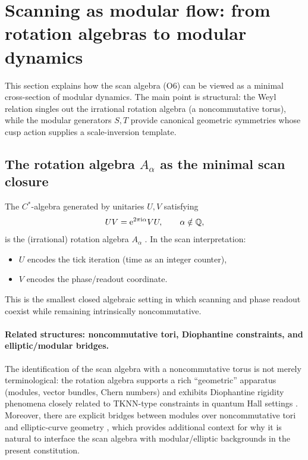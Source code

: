 \section{Scanning as modular flow: from rotation algebras to modular dynamics}
\label{sec:scanning_as_modular_flow}

This section explains how the scan algebra (O6) can be viewed as a minimal cross-section of modular dynamics. The main point is structural: the Weyl relation singles out the irrational rotation algebra (a noncommutative torus), while the modular generators $S,T$ provide canonical geometric symmetries whose cusp action supplies a scale-inversion template.

\subsection{The rotation algebra \texorpdfstring{$A_\alpha$}{A\_alpha} as the minimal scan closure}
\label{sec:rotation_algebra}

The $C^*$-algebra generated by unitaries $U,V$ satisfying
\begin{equation}
UV=\mathrm{e}^{2\pi\mathrm{i}\alpha}VU,\qquad \alpha\notin\mathbb{Q},
\end{equation}
is the (irrational) rotation algebra $A_\alpha$ \cite{Rieffel1981,Connes1994}. In the scan interpretation:
\begin{itemize}
  \item $U$ encodes the tick iteration (time as an integer counter),
  \item $V$ encodes the phase/readout coordinate.
\end{itemize}
This is the smallest closed algebraic setting in which scanning and phase readout coexist while remaining intrinsically noncommutative.

\paragraph{Related structures: noncommutative tori, Diophantine constraints, and elliptic/modular bridges.}
The identification of the scan algebra with a noncommutative torus is not merely terminological: the rotation algebra supports a rich ``geometric'' apparatus (modules, vector bundles, Chern numbers) and exhibits Diophantine rigidity phenomena closely related to TKNN-type constraints in quantum Hall settings \cite{DeNittisLandi2011GeneralizedTKNN}.
Moreover, there are explicit bridges between modules over noncommutative tori and elliptic-curve geometry \cite{FioreFranco2014ModulesNCTorusElliptic}, which provides additional context for why it is natural to interface the scan algebra with modular/elliptic backgrounds in the present constitution.

